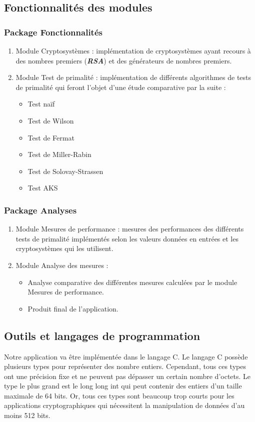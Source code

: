 	
	\subsection{Fonctionnalités des modules}
		\subsubsection*{Package Fonctionnalités}
			\begin{enumerate}[leftmargin=*]
				\item Module Cryptosystèmes : implémentation de cryptosystèmes ayant recours à des nombres premiers (\textbf{\textit{RSA}}) et des générateurs de nombres premiers.
				\item Module Test de primalité : implémentation de différents algorithmes de tests de primalité qui feront l'objet d'une étude comparative par la suite :
				\begin{itemize}
					\item Test naïf
					\item Test de Wilson
					\item Test de Fermat
					\item Test de Miller-Rabin
					\item Test de Solovay-Strassen
					\item Test AKS
				\end{itemize}
			\end{enumerate}
			
			\subsubsection*{Package Analyses}
			\begin{enumerate}[leftmargin=*]
				\item Module Mesures de performance : mesures des performances des différents tests de primalité implémentés selon les valeurs données en entrées et les cryptosystèmes qui les utilisent.
				\item Module Analyse des mesures :
				\begin{itemize}[leftmargin=0.2cm]
					\item Analyse comparative des différentes mesures calculées par le module Mesures de performance.
					\item Produit final de l'application.
				\end{itemize}
			\end{enumerate}
	
	\subsection{Outils et langages de programmation}
	Notre application va être implémentée dans le langage {\ttfamily C}. Le langage {\ttfamily C} possède plusieurs types pour représenter des nombre entiers. Cependant, tous ces types ont une précision fixe et ne peuvent pas dépasser un certain nombre d'octets. Le type le plus grand est le {\ttfamily long long int} qui peut contenir des entiers d'un taille maximale de 64 bits. Or, tous ces types sont beaucoup trop courts pour les applications cryptographiques qui nécessitent la manipulation de données d'au moins 512 bits.

